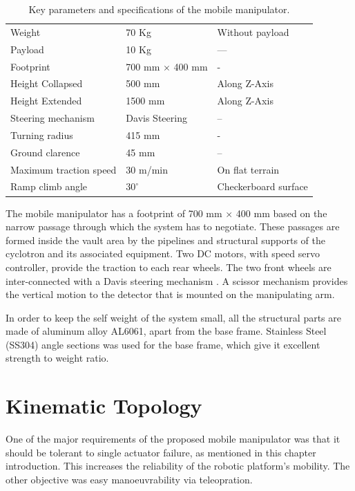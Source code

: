 %
\begin{table}[!htbp]
	\caption{Key parameters and specifications of the mobile manipulator.}
	\label{tb:specifications}
	\centering
	\begin{tabular}{l l l}
		\hline
		
		Weight  & 70 Kg & Without payload \\ 
		Payload & 10 Kg &---\\
		Footprint & 700 mm $\times$  400 mm & - \\
		Height Collapsed & 500 mm  & Along  Z-Axis\\
		Height Extended & 1500 mm & Along  Z-Axis  \\
		Steering mechanism & Davis Steering & --\\
		Turning radius & 415 mm & - \\
		Ground clarence & 45 mm & --\\
		Maximum traction speed & 30 m/min & On flat terrain \\
		Ramp climb angle & $30^\circ $ & Checkerboard surface\\
		\hline
	\end{tabular}
\end{table}

The mobile manipulator has a footprint of 700 mm $\times$  400 mm  based on the narrow passage through which the system  has to negotiate. These passages are formed inside the vault area by the pipelines and  structural supports of the cyclotron and its associated equipment.  Two DC motors, with speed servo controller,  provide the traction to each rear wheels. The two front wheels are  inter-connected with a Davis steering mechanism \cite{TOMBook}. A scissor mechanism provides the vertical  motion to the detector that is mounted on the manipulating arm.

 In order to keep the self weight of the system small, all the  structural parts are made of aluminum alloy AL6061, apart from the base frame. Stainless Steel (SS304)  angle sections was used for the base frame, which give it  excellent strength to weight ratio. 
 
 \section{Kinematic Topology}
 \label{sec:KineTopo}
 One of the major requirements of the proposed mobile manipulator was that it should be tolerant to single actuator failure, as mentioned in this chapter introduction. This increases the reliability of the robotic platform's mobility. The other objective was easy manoeuvrability via teleopration.
 
